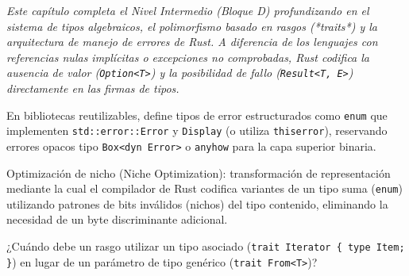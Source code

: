 \documentclass{book}
\begin{document}
\noindent\textit{Este capítulo completa el Nivel Intermedio (Bloque D) profundizando en el sistema de tipos algebraicos, el polimorfismo basado en rasgos (*traits*) y la arquitectura de manejo de errores de Rust. A diferencia de los lenguajes con referencias nulas implícitas o excepciones no comprobadas, Rust codifica la ausencia de valor (\texttt{Option<T>}) y la posibilidad de fallo (\texttt{Result<T, E>}) directamente en las firmas de tipos.}

\begin{tcolorbox}[title={Consejo}, studiumtip, breakable]

En bibliotecas reutilizables, define tipos de error estructurados como \texttt{enum} que implementen \texttt{std::error::Error} y \texttt{Display} (o utiliza \texttt{thiserror}), reservando errores opacos tipo \texttt{Box<dyn Error>} o \texttt{anyhow} para la capa superior binaria.
\end{tcolorbox}

\begin{tcolorbox}[title={Definición}, studiumdef, breakable]

Optimización de nicho (Niche Optimization): transformación de representación mediante la cual el compilador de Rust codifica variantes de un tipo suma (\texttt{enum}) utilizando patrones de bits inválidos (nichos) del tipo contenido, eliminando la necesidad de un byte discriminante adicional.
\end{tcolorbox}

\begin{tcolorbox}[title={Autoficha}, studiumcheck, breakable]

¿Cuándo debe un rasgo utilizar un tipo asociado (\texttt{trait Iterator \{ type Item; \}}) en lugar de un parámetro de tipo genérico (\texttt{trait From<T>})?
\end{tcolorbox}
\end{document}
